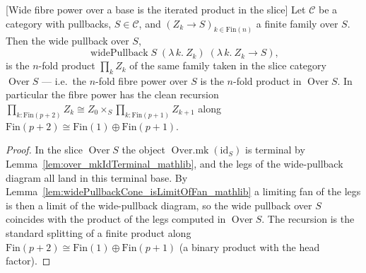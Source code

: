 
\begin{lemma}

[Wide fibre power over a base is the iterated product in the slice]
  \label{lem:widePullback_overX_eq_prod}
  Let \(\mathcal{C}\) be a category with pullbacks, \(S \in \mathcal{C}\), and
  \((Z_k \to S)_{k \in \mathrm{Fin}(n)}\) a finite family over \(S\). Then the wide pullback over
  \(S\),
  \[
    \operatorname{widePullback} S\;(\lambda\,k.\ Z_k)\;(\lambda\,k.\ Z_k \to S),
  \]
  is the \(n\)-fold product \(\prod_{k} Z_k\) of the same family taken in the slice category
  \(\operatorname{Over} S\) --- i.e.\ the \(n\)-fold fibre power over \(S\) is the \(n\)-fold product
  in \(\operatorname{Over} S\). In particular the fibre power has the clean recursion
  \(\prod_{k : \mathrm{Fin}(p+2)} Z_k \cong Z_0 \times_S \prod_{k : \mathrm{Fin}(p+1)} Z_{k+1}\)
  along \(\mathrm{Fin}(p+2) \cong \mathrm{Fin}(1) \oplus \mathrm{Fin}(p+1)\).
\end{lemma}
\begin{proof}
  In the slice \(\operatorname{Over} S\) the object \(\operatorname{Over.mk}(\mathrm{id}_S)\) is
  terminal by Lemma~\ref{lem:over_mkIdTerminal_mathlib}, and the legs of the wide-pullback diagram
  all land in this terminal base. By Lemma~\ref{lem:widePullbackCone_isLimitOfFan_mathlib} a
  limiting fan of the legs is then a limit of the wide-pullback diagram, so the wide pullback over
  \(S\) coincides with the product of the legs computed in \(\operatorname{Over} S\). The recursion
  is the standard splitting of a finite product along \(\mathrm{Fin}(p+2) \cong \mathrm{Fin}(1)
  \oplus \mathrm{Fin}(p+1)\) (a binary product with the head factor).
\end{proof}

